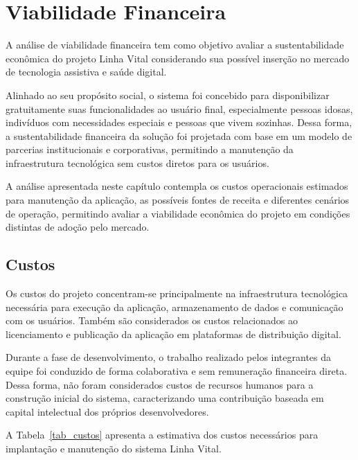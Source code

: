 \chapter{Viabilidade Financeira}

A análise de viabilidade financeira tem como objetivo avaliar a sustentabilidade econômica do projeto Linha Vital considerando sua possível inserção no mercado de tecnologia assistiva e saúde digital.

Alinhado ao seu propósito social, o sistema foi concebido para disponibilizar gratuitamente suas funcionalidades ao usuário final, especialmente pessoas idosas, indivíduos com necessidades especiais e pessoas que vivem sozinhas. Dessa forma, a sustentabilidade financeira da solução foi projetada com base em um modelo de parcerias institucionais e corporativas, permitindo a manutenção da infraestrutura tecnológica sem custos diretos para os usuários.

A análise apresentada neste capítulo contempla os custos operacionais estimados para manutenção da aplicação, as possíveis fontes de receita e diferentes cenários de operação, permitindo avaliar a viabilidade econômica do projeto em condições distintas de adoção pelo mercado.

\section{Custos}

Os custos do projeto concentram-se principalmente na infraestrutura tecnológica necessária para execução da aplicação, armazenamento de dados e comunicação com os usuários. Também são considerados os custos relacionados ao licenciamento e publicação da aplicação em plataformas de distribuição digital.

Durante a fase de desenvolvimento, o trabalho realizado pelos integrantes da equipe foi conduzido de forma colaborativa e sem remuneração financeira direta. Dessa forma, não foram considerados custos de recursos humanos para a construção inicial do sistema, caracterizando uma contribuição baseada em capital intelectual dos próprios desenvolvedores.

A Tabela~\ref{tab_custos} apresenta a estimativa dos custos necessários para implantação e manutenção do sistema Linha Vital.

